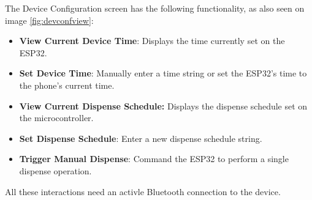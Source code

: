 The Device Configuration screen has the following functionality, as also seen on image \ref{fig:devconfview}:
\begin{itemize}
		\item \textbf{View Current Device Time}: Displays the time currently set on the ESP32.
		\item \textbf{Set Device Time}: Manually enter a time string or set the ESP32's time to the phone's current time.
		\item \textbf{View Current Dispense Schedule:} Displays the dispense schedule set on the microcontroller.
		\item \textbf{Set Dispense Schedule}: Enter a new dispense schedule string.
		\item \textbf{Trigger Manual Dispense}: Command the ESP32 to perform a single dispense operation.
\end{itemize}
All these interactions need an activle Bluetooth connection to the device.

